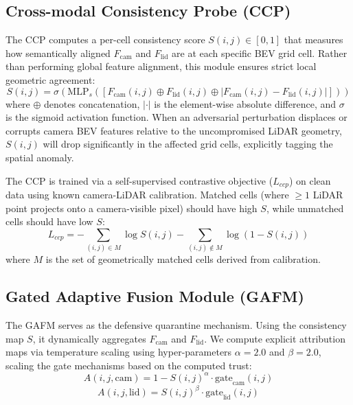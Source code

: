\subsection{Cross-modal Consistency Probe (CCP)}
The CCP computes a per-cell consistency score $S(i,j) \in [0,1]$ that measures how semantically aligned $F_{\text{cam}}$ and $F_{\text{lid}}$ are at each specific BEV grid cell. Rather than performing global feature alignment, this module ensures strict local geometric agreement:
\begin{equation}
S(i,j) = \sigma\left( \text{MLP}_s\left( \left[F_{\text{cam}}(i,j) \oplus F_{\text{lid}}(i,j) \oplus |F_{\text{cam}}(i,j) - F_{\text{lid}}(i,j)|\right] \right) \right)
\end{equation}
where $\oplus$ denotes concatenation, $|\cdot|$ is the element-wise absolute difference, and $\sigma$ is the sigmoid activation function. When an adversarial perturbation displaces or corrupts camera BEV features relative to the uncompromised LiDAR geometry, $S(i,j)$ will drop significantly in the affected grid cells, explicitly tagging the spatial anomaly.

The CCP is trained via a self-supervised contrastive objective ($L_{ccp}$) on clean data using known camera-LiDAR calibration. Matched cells (where $\ge 1$ LiDAR point projects onto a camera-visible pixel) should have high $S$, while unmatched cells should have low $S$:
\begin{equation}
L_{ccp} = - \sum_{(i,j)\in M} \log S(i,j) - \sum_{(i,j)\notin M} \log(1 - S(i,j))
\end{equation}
where $M$ is the set of geometrically matched cells derived from calibration.

\subsection{Gated Adaptive Fusion Module (GAFM)}
The GAFM serves as the defensive quarantine mechanism. Using the consistency map $S$, it dynamically aggregates $F_{\text{cam}}$ and $F_{\text{lid}}$. We compute explicit attribution maps via temperature scaling using hyper-parameters $\alpha=2.0$ and $\beta=2.0$, scaling the gate mechanisms based on the computed trust:
\begin{equation}
A(i,j,\text{cam}) = 1 - S(i,j)^\alpha  \cdot  \text{gate}_{\text{cam}}(i,j)
\end{equation}
\begin{equation}
A(i,j,\text{lid}) = S(i,j)^\beta  \cdot  \text{gate}_{\text{lid}}(i,j)
\end{equation}

